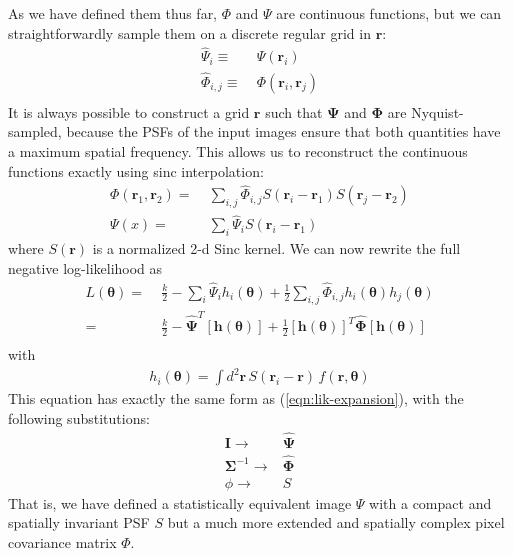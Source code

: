 \documentclass[10pt]{article}
\newcommand{\eqnref}[1]{(\ref{eqn:#1})}
\begin{document}
As we have defined them thus far, $\Phi$ and $\Psi$ are continuous functions, but we can straightforwardly sample them on a discrete regular grid in $\bm{r}$:
\begin{align}
\hat{\Psi}_{i} \equiv\; & \Psi(\bm{r}_i) \\
\hat{\Phi}_{i,j} \equiv\; & \Phi(\bm{r}_i,\bm{r}_j) \\
\end{align}
It is always possible to construct a grid $\bm{r}$ such that $\bm{\Psi}$ and $\bm{\Phi}$ are Nyquist-sampled, because the PSFs of the input images ensure that both quantities have a maximum spatial frequency.  This allows us to reconstruct the continuous functions exactly using sinc interpolation:
\begin{align}
\Phi(\bm{r}_1,\bm{r}_2) =\;& \sum_{i,j} \hat{\Phi}_{i,j}
    S(\bm{r}_i-\bm{r}_1) S(\bm{r}_j-\bm{r}_2)
    \label{eqn:phi-interpolated}\\
\Psi(x) =\;& \sum_i
    \hat{\Psi}_{i} S(\bm{r}_i-\bm{r}_1)
    \label{eqn:psi-interpolated}
\end{align}
where $S(\bm{r})$ is a normalized 2-d Sinc kernel.  We can now rewrite the full negative log-likelihood as
\begin{align}
L(\bm{\theta}) =\;& \frac{k}{2}
        - \sum_i \hat{\Psi}_i h_i(\bm{\theta})
        + \frac{1}{2} \sum_{i,j}
            \hat{\Phi}_{i,j} h_{i}(\bm{\theta}) h_j(\bm{\theta})\\
    =\;& \frac{k}{2}
        - \hat{\bm{\Psi}}^T\left[\bm{h}(\bm{\theta})\right]
        + \frac{1}{2}
                \left[\bm{h}(\bm{\theta})\right]^T
                \hat{\bm{\Phi}}
                \left[\bm{h}(\bm{\theta})\right]\\
    \label{eqn:lik-from-samples}
\end{align}
with
\begin{align}
    h_{i}(\bm{\theta}) =
        \int\!d^2\bm{r}\,S(\bm{r}_i - \bm{r})\,f(\bm{r},\bm{\theta})
    \label{eqn:sinc-convolved-model}
\end{align}
This equation has exactly the same form as \eqnref{lik-expansion}, with the following substitutions:
\begin{align}
\bm{I} \longrightarrow & \bm{\hat{\Psi}} \\
\bm{\Sigma}^{-1} \longrightarrow & \bm{\hat{\Phi}} \\
\phi \longrightarrow & S
\end{align}
That is, we have defined a statistically equivalent image $\Psi$ with a compact and spatially invariant PSF $S$ but a much more extended and spatially complex pixel covariance matrix $\Phi$.
\end{document}
